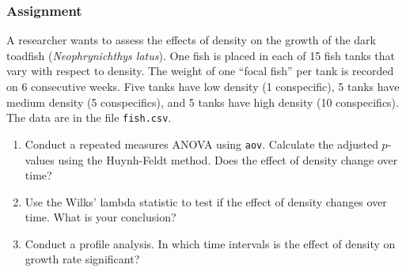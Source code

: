 \documentclass[color=usenames,dvipsnames]{beamer}\usepackage[]{graphicx}\usepackage[]{color}
\newcommand{\inr}[1]{\colorbox{inlinecolor}{\texttt{#1}}}
\begin{document}
\begin{frame}
  \frametitle{Assignment}
  \footnotesize
  A researcher wants to assess the effects of density on the growth
  of the dark toadfish ({\it Neophrynichthys latus}). One fish is
  placed in each of 15 fish tanks that vary with respect to
  density. The weight of one ``focal fish'' per tank  is recorded on 6
  consecutive weeks. Five tanks have low density (1 conspecific), 5
  tanks have medium density (5 conspecifics), and 5 tanks have high
  density (10 conspecifics). The data are in the file {\tt fish.csv}.
  \pause
  \vfill
  \begin{enumerate}[\bf (1)]
    \item Conduct a repeated measures ANOVA using \inr{aov}. Calculate the adjusted $p$-values using the Huynh-Feldt
      method. Does the effect of density change over time?
    \item Use the Wilks' lambda statistic to test if the effect of
      density changes over time. What is your conclusion?
    \item Conduct a profile analysis. In which time intervals is the
      effect of density on growth rate significant?
  \end{enumerate}
\end{frame}
\end{document}
